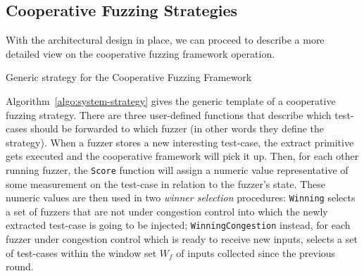 \subsection{Cooperative Fuzzing Strategies}
With the architectural design in place, we can proceed to describe a more
detailed view on the cooperative fuzzing framework operation.

\begin{algorithm}
    \DontPrintSemicolon
    \BlankLine
\caption{Generic strategy for the Cooperative Fuzzing Framework}
\label{algo:system-strategy}
\end{algorithm}

Algorithm~\ref{algo:system-strategy} gives the generic template of a cooperative
fuzzing strategy. There are three user-defined functions that describe which
test-cases should be forwarded to which fuzzer (in other words they define the
strategy). When a fuzzer stores a new interesting test-case, the extract
primitive gets executed and the cooperative framework will pick it up. Then, for
each other running fuzzer, the \texttt{Score} function will assign a numeric
value representative of some measurement on the test-case in relation to the
fuzzer's state. These numeric values are then used in two \emph{winner
selection} procedures: \texttt{Winning} selects a set of fuzzers that are not
under congestion control into which the newly extracted test-case is going to be
injected; \texttt{WinningCongestion} instead, for each fuzzer under congestion
control which is ready to receive new inputs, selects a set of test-cases within
the window set $W_f$ of inputs collected since the previous round.


